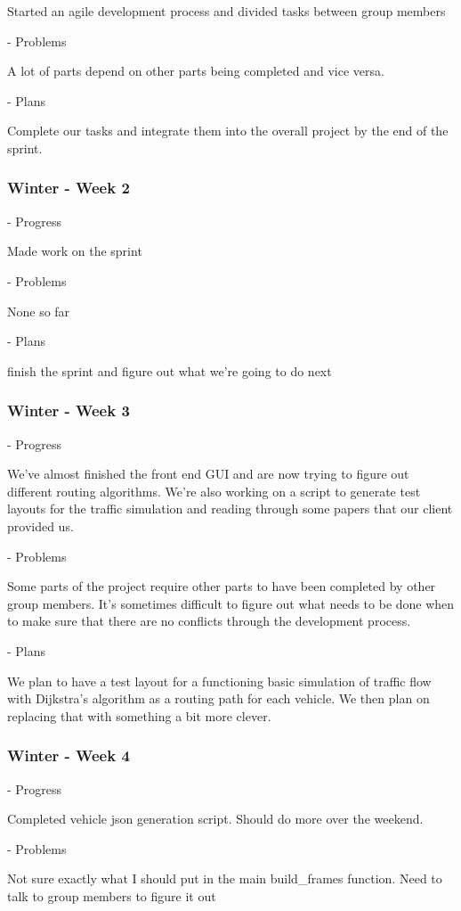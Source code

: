 \documentclass[onecolumn, draftclsnofoot,10pt, compsoc]{IEEEtran}
\begin{document}
Started an agile development process and divided tasks between group members

- Problems

A lot of parts depend on other parts being completed and vice versa.

- Plans

Complete our tasks and integrate them into the overall project by the end of the sprint.
\subsubsection{Winter - Week 2}
- Progress

Made work on the sprint

- Problems

None so far

- Plans

finish the sprint and figure out what we're going to do next
\subsubsection{Winter - Week 3}
- Progress

We've almost finished the front end GUI and are now trying to figure out different routing algorithms.
We're also working on a script to generate test layouts for the traffic simulation and reading through some papers that our client provided us.

- Problems

Some parts of the project require other parts to have been completed by other group members.
It's sometimes difficult to figure out what needs to be done when to make sure that there are no conflicts through the development process.

- Plans

We plan to have a test layout for a functioning basic simulation of traffic flow with Dijkstra's algorithm as a routing path for each vehicle.
We then plan on replacing that with something a bit more clever.
\subsubsection{Winter - Week 4}
- Progress

Completed vehicle json generation script.
Should do more over the weekend.

- Problems

Not sure exactly what I should put in the main build\_frames function. Need to talk to group members to figure it out
\end{document}
